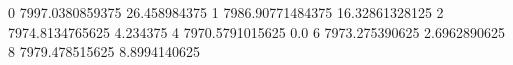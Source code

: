 0 7997.0380859375 26.458984375
1 7986.90771484375 16.32861328125
2 7974.8134765625 4.234375
4 7970.5791015625 0.0
6 7973.275390625 2.6962890625
8 7979.478515625 8.8994140625
